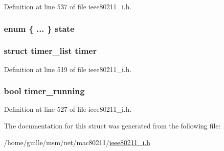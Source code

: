 Definition at line 537 of file ieee80211\-\_\-i.\-h.

\hypertarget{structieee80211__if__ibss_a3253c6d1cd5d679b637262e95a0986a1}{
\subsubsection[{state}]{\setlength{\rightskip}{0pt plus 5cm}enum \{ ... \}   state}}\label{structieee80211__if__ibss_a3253c6d1cd5d679b637262e95a0986a1}
\hypertarget{structieee80211__if__ibss_ae8aedee6c0bd2f7edbb10f18d574f107}{
\subsubsection[{timer}]{\setlength{\rightskip}{0pt plus 5cm}struct timer\-\_\-list timer}}\label{structieee80211__if__ibss_ae8aedee6c0bd2f7edbb10f18d574f107}


Definition at line 519 of file ieee80211\-\_\-i.\-h.

\hypertarget{structieee80211__if__ibss_a23958e610207eb28549d8d13255aa129}{
\subsubsection[{timer\-\_\-running}]{\setlength{\rightskip}{0pt plus 5cm}bool timer\-\_\-running}}\label{structieee80211__if__ibss_a23958e610207eb28549d8d13255aa129}


Definition at line 527 of file ieee80211\-\_\-i.\-h.



The documentation for this struct was generated from the following file\-:\begin{DoxyCompactItemize}
\item 
/home/guille/msm/net/mac80211/\hyperlink{ieee80211__i_8h}{ieee80211\-\_\-i.\-h}\end{DoxyCompactItemize}
